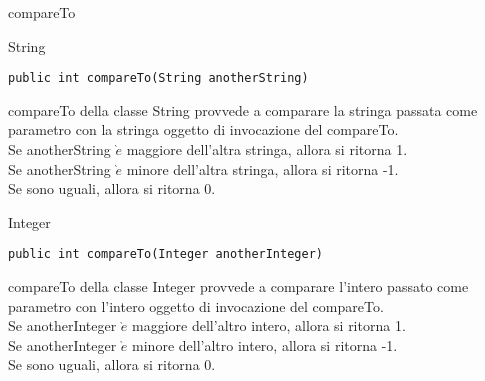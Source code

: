\documentclass{beamer}
\begin{document}
\begin{frame}[fragile]{compareTo}
\begin{block}{String}
\begin{lstlisting}
public int compareTo(String anotherString)
\end{lstlisting}
\fontsize{10pt}{7.2}\selectfont
compareTo della classe String provvede a comparare la stringa passata come parametro con la stringa oggetto di invocazione del compareTo.\\
Se anotherString $\grave{e}$ maggiore dell'altra stringa, allora si ritorna 1.\\
Se anotherString $\grave{e}$ minore dell'altra stringa, allora si ritorna -1.\\
Se sono uguali, allora si ritorna 0.
\end{block}

\begin{block}{Integer}
\begin{lstlisting}
public int compareTo(Integer anotherInteger)
\end{lstlisting}
\fontsize{10pt}{7.2}\selectfont
compareTo della classe Integer provvede a comparare l'intero
passato come parametro con l'intero oggetto di invocazione del compareTo.\\
Se anotherInteger $\grave{e}$ maggiore dell'altro intero, allora si ritorna 1.\\
Se anotherInteger $\grave{e}$ minore dell'altro intero, allora si ritorna -1.\\
Se sono uguali, allora si ritorna 0.
\end{block}

\end{frame}
\end{document}
